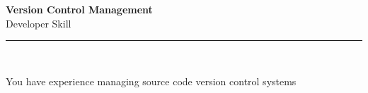 \documentclass[11pt,a4paper]{memoir}
\begin{document}
    \begin{Spacing}{0.75}%
        \noindent
        \large
        \textbf{Version Control Management}\\[3pt]
        \scriptsize\color{gray}Developer Skill\\ 
        \rule{\textwidth}{.3mm}\\
        
        \vspace{3mm}
        \noindent
        \begin{minipage}[t]{53mm}
            \begin{flushleft}
            {
                \normalsize
                \begin{Spacing}{1}%
                \color{black}\textrm{You have experience managing source code version control systems}\\
                \end{Spacing}
            }
            \end{flushleft}
        \end{minipage}

        \vspace{5mm}
        \noindent
        \begin{minipage}[t]{53mm}
            \begin{flushleft}
            {
                \normalsize
                \begin{Spacing}{1}%
                \color{gray}\textit{}\\
                \end{Spacing}
            }
            \end{flushleft}
        \end{minipage}
    \end{Spacing}
    \clearpage
\end{document}
